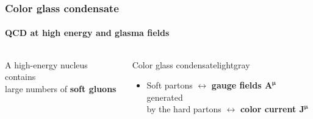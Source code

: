 \documentclass[aspectratio=169,11pt,usenames,dvipsnames]{beamer}
\begin{document}
\begin{frame}
    \frametitle{Color glass condensate}
    \framesubtitle{QCD at high energy and glasma fields}
    \vspace{-15pt}
    \begin{columns}[onlytextwidth,t]
            \vspace{5pt}
            \begin{center}
                \footnotesize\color{lightgray}A high-energy nucleus contains \\ large numbers of {\bfseries\color{palviolet}soft gluons}
            \end{center}
            \hspace{10pt}

            \vspace{0pt}
           
            \begin{custombox2}{Color glass condensate}{lightgray}
                \small
                \begin{varwidth}{0.92\textwidth}
                \begin{itemize}\itemsep0em 
                    \item 
                    Soft partons $\leftrightarrow$ {\color{palviolet}\bfseries gauge fields $\boldsymbol{A^\mu}$} generated \\ by the hard partons $\leftrightarrow$ {\color{palteal}\bfseries color current $\boldsymbol{J^\mu}$}
                \end{itemize}
                \end{varwidth}
            \end{custombox2}


\end{columns}
\end{frame}
\end{document}
